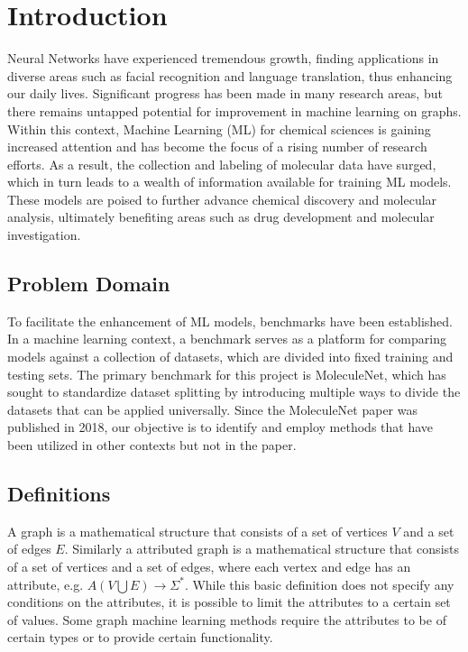 \section{Introduction}

Neural Networks have experienced tremendous growth, finding applications in diverse areas such as facial recognition and language translation, thus enhancing our daily lives. Significant progress has been made in many research areas, but there remains untapped potential for improvement in machine learning on graphs. Within this context, Machine Learning (ML) for chemical sciences is gaining increased attention and has become the focus of a rising number of research efforts. As a result, the collection and labeling of molecular data have surged, which in turn leads to a wealth of information available for training ML models. These models are poised to further advance chemical discovery and molecular analysis, ultimately benefiting areas such as drug development and molecular investigation.

\subsection{Problem Domain}

To facilitate the enhancement of ML models, benchmarks have been established. In a machine learning context, a benchmark serves as a platform for comparing models against a collection of datasets, which are divided into fixed training and testing sets. The primary benchmark for this project is MoleculeNet, which has sought to standardize dataset splitting by introducing multiple ways to divide the datasets that can be applied universally. Since the MoleculeNet paper was published in 2018, our objective is to identify and employ methods that have been utilized in other contexts but not in the paper.

\subsection{Definitions}

A graph is a mathematical structure that consists of a set of vertices $V$ and a set of edges $E$.
Similarly a attributed graph is a mathematical structure that consists of a set of vertices and a set of edges, where each vertex and edge has an attribute, e.g. $A(V \bigcup E) \to \Sigma^*$.
While this basic definition does not specify any conditions on the attributes, it is possible to limit the attributes to a certain set of values.
Some graph machine learning methods require the attributes to be of certain types or to provide certain functionality.
